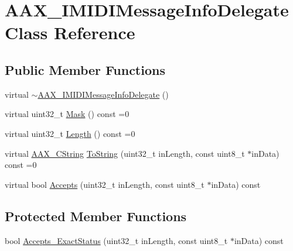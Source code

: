 \hypertarget{a00104}{}\section{A\+A\+X\+\_\+\+I\+M\+I\+D\+I\+Message\+Info\+Delegate Class Reference}
\label{a00104}
\subsection*{Public Member Functions}
\begin{DoxyCompactItemize}
\item 
virtual \hyperlink{a00104_a33acb96476b625d0efcc066d86087464}{$\sim$\+A\+A\+X\+\_\+\+I\+M\+I\+D\+I\+Message\+Info\+Delegate} ()
\item 
virtual uint32\+\_\+t \hyperlink{a00104_ad04902fa8b4e437f200a314721eeaea4}{Mask} () const =0
\item 
virtual uint32\+\_\+t \hyperlink{a00104_a7e4bb6faf47d70dbefcdde952dd76e1c}{Length} () const =0
\item 
virtual \hyperlink{a00042}{A\+A\+X\+\_\+\+C\+String} \hyperlink{a00104_ace3e3e5900288bd6de7dd2612a57afc2}{To\+String} (uint32\+\_\+t in\+Length, const uint8\+\_\+t $\ast$in\+Data) const =0
\item 
virtual bool \hyperlink{a00104_a6415d318f04bc3c0e5ecd0ac5a8f573f}{Accepts} (uint32\+\_\+t in\+Length, const uint8\+\_\+t $\ast$in\+Data) const 
\end{DoxyCompactItemize}
\subsection*{Protected Member Functions}
\begin{DoxyCompactItemize}
\item 
bool \hyperlink{a00104_a674f21c1cdfa0faac65e913df05cba03}{Accepts\+\_\+\+Exact\+Status} (uint32\+\_\+t in\+Length, const uint8\+\_\+t $\ast$in\+Data) const 
\end{DoxyCompactItemize}

